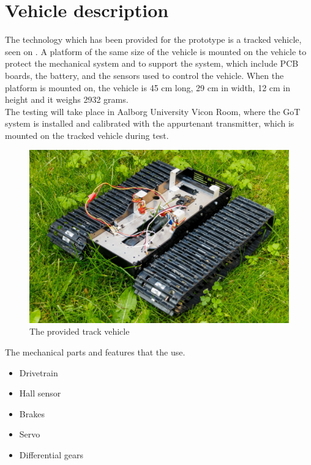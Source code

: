 \section{Vehicle description}
\label{sec:Vehicledescription}
The technology which has been provided for the prototype is a tracked vehicle, seen on . A platform of the same size of the vehicle  is mounted on the vehicle to protect the mechanical system and to support the system, which include PCB boards, the battery, and the sensors used to control the vehicle. When the platform is mounted on, the vehicle is 45 cm long, 29 cm in width, 12 cm in height and it weighs 2932 grams.\\
The testing will take place in Aalborg University Vicon Room, where the GoT system is installed and calibrated with the appurtenant transmitter, which is mounted on the tracked vehicle during test.

\begin{figure}[H]
	\centering
	\includegraphics[scale=0.8]{figures/BeltVehicle.jpg}
	\caption{The provided track vehicle}
	\label{TrackedVehicle}
\end{figure}


The mechanical parts and features that the use.
\begin{itemize}
\item Drivetrain
\item Hall sensor
\item Brakes
\item Servo
\item Differential gears
\end{itemize}

